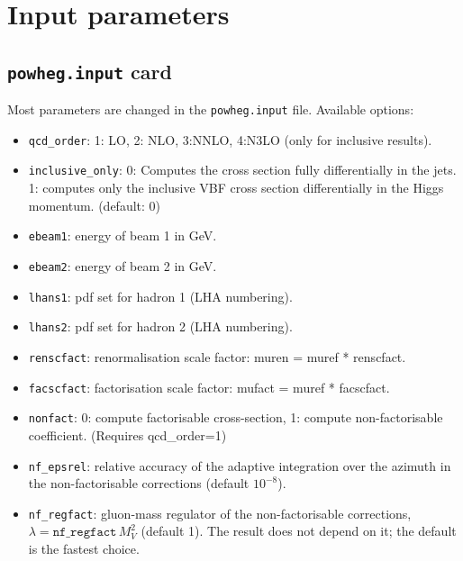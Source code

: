 \documentclass[12pt,a4]{article}
\begin{document}
\section{Input parameters}
\subsection{\texttt{powheg.input} card}
Most parameters are changed in the \texttt{powheg.input} file.
%
Available options:
\begin{itemize}
\item \texttt{qcd\_order}: 1: LO, 2: NLO, 3:NNLO, 4:N3LO (only for
  inclusive results).

\item \texttt{inclusive\_only}: 0: Computes the cross section fully
  differentially in the jets. 1: computes only the inclusive VBF cross
  section differentially in the Higgs momentum. (default: 0)

\item\texttt{ebeam1}: energy of beam 1 in GeV.
  
\item\texttt{ebeam2}: energy of beam 2 in GeV.

\item\texttt{lhans1}: pdf set for hadron 1 (LHA numbering).

\item\texttt{lhans2}: pdf set for hadron 2 (LHA numbering).

\item\texttt{renscfact}: renormalisation scale factor: muren = muref *
  renscfact.
  
\item\texttt{facscfact}: factorisation scale factor: mufact = muref *
  facscfact.
  
\item\texttt{nonfact}: 0: compute factorisable cross-section, 1: compute
  non-factorisable coefficient. (Requires qcd\_order=1)
  
\item\texttt{nf\_epsrel}: relative accuracy of the adaptive integration
  over the azimuth in the non-factorisable corrections (default
  $10^{-8}$).
  
\item\texttt{nf\_regfact}: gluon-mass regulator of the non-factorisable
  corrections, $\lambda = \texttt{nf\_regfact}\, M_V^2$ (default 1). The
  result does not depend on it; the default is the fastest choice.
  

\end{itemize}
\end{document}
